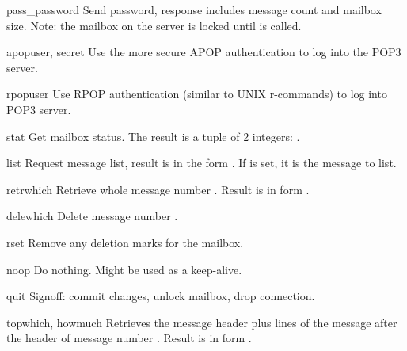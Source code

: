 \begin{methoddesc}{pass_}{password}
Send password, response includes message count and mailbox size.
Note: the mailbox on the server is locked until  is
called.
\end{methoddesc}

\begin{methoddesc}{apop}{user, secret}
Use the more secure APOP authentication to log into the POP3 server.
\end{methoddesc}

\begin{methoddesc}{rpop}{user}
Use RPOP authentication (similar to UNIX r-commands) to log into POP3 server.
\end{methoddesc}

\begin{methoddesc}{stat}{}
Get mailbox status.  The result is a tuple of 2 integers:
.
\end{methoddesc}

\begin{methoddesc}{list}{}
Request message list, result is in the form
.  If  is
set, it is the message to list.
\end{methoddesc}

\begin{methoddesc}{retr}{which}
Retrieve whole message number .  Result is in form 
.
\end{methoddesc}

\begin{methoddesc}{dele}{which}
Delete message number .
\end{methoddesc}

\begin{methoddesc}{rset}{}
Remove any deletion marks for the mailbox.
\end{methoddesc}

\begin{methoddesc}{noop}{}
Do nothing.  Might be used as a keep-alive.
\end{methoddesc}

\begin{methoddesc}{quit}{}
Signoff:  commit changes, unlock mailbox, drop connection.
\end{methoddesc}

\begin{methoddesc}{top}{which, howmuch}
Retrieves the message header plus  lines of the message
after the header of message number . Result is in form 
.
\end{methoddesc}

